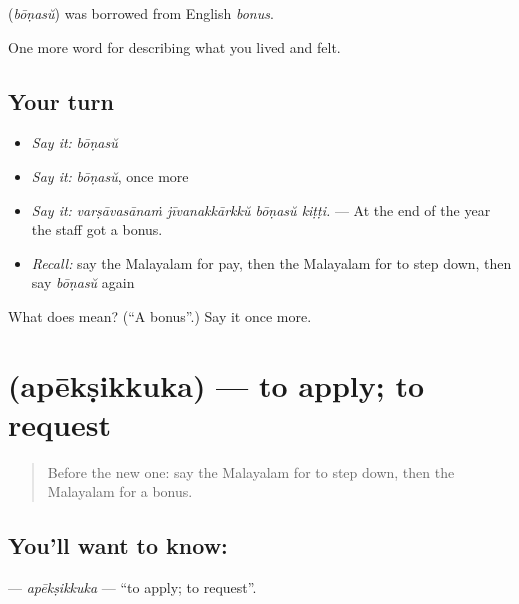 \begin{cousinweb}
\textbf{} (\emph{bōṇasŭ}) was borrowed from English \emph{bonus}.
\end{cousinweb}

\begin{grammarlens}[title={What you've built}]
One more word for describing what you lived and felt.
\end{grammarlens}

\subsection*{Your turn}
\begin{itemize}
\raggedright
  \item \emph{Say it:} \emph{bōṇasŭ}
  \item \emph{Say it:} \emph{bōṇasŭ}, once more
  \item \emph{Say it:} \emph{varṣāvasānaṁ jīvanakkārkkŭ bōṇasŭ kiṭṭi.} — At the end of the year the staff got a bonus.
  \item \emph{Recall:} say the Malayalam for pay, then the Malayalam for to step down, then say \emph{bōṇasŭ} again
\end{itemize}

\begin{tcolorbox}[breakable,colback=teal!4,colframe=teal!35!black,title={Before you move on}]
What does  mean? (\textquotedblleft{}A bonus\textquotedblright{}.) Say it once more.
\end{tcolorbox}
\section[\texorpdfstring{\ml{അപേക്ഷിക്കുക} (apēkṣikkuka)}{അപേക്ഷിക്കുക (apēkṣikkuka)}]{ (apēkṣikkuka) — to apply; to request}

\label{lesson:ML-C543-apeksikkuka}



\begin{quote}
Before the new one: say the Malayalam for to step down, then the Malayalam for a bonus.
\end{quote}

\subsection*{You'll want to know: }
\textbf{} — \emph{apēkṣikkuka} — \textquotedblleft{}to apply; to request\textquotedblright{}.

